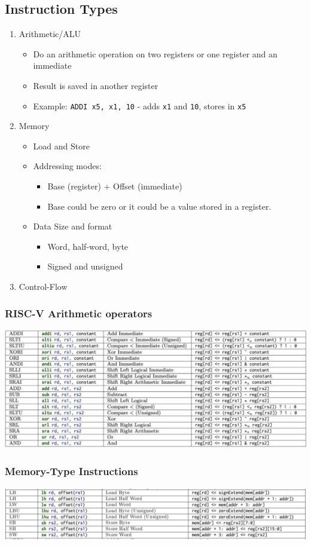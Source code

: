 \documentclass[10pt]{article}
\begin{document}
\subsection*{Instruction Types}
\begin{enumerate}
    \item Arithmetic/ALU
    \begin{itemize}
        \item Do an arithmetic operation on two registers or one register and an immediate
        \item Result is saved in another register
        \item Example: \texttt{ADDI x5, x1, 10} - adds \texttt{x1} and \texttt{10}, stores in \texttt{x5}
    \end{itemize}
    \item Memory
    \begin{itemize}
        \item Load and Store
        \item Addressing modes:
        \begin{itemize}
            \item Base (register) + Offset (immediate)
            \item Base could be zero or it could be a value stored in a register.
        \end{itemize}
        \item Data Size and format
        \begin{itemize}
            \item Word, half-word, byte
            \item Signed and unsigned
        \end{itemize}
    \end{itemize}
    \item Control-Flow
\end{enumerate}
\subsubsection*{RISC-V Arithmetic operators}
\begin{center}
\includegraphics*[scale=0.4]{W1_4.png}
\end{center}
\subsubsection*{Memory-Type Instructions}
\begin{center}
\includegraphics*[scale=0.47]{W1_5.png}
\end{center}
\end{document}
